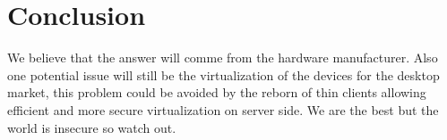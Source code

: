 \section{Conclusion}

We believe that the answer will comme from the hardware manufacturer.
Also one potential issue will still be the virtualization of the devices for
the desktop market, this problem could be avoided by the reborn of thin clients
allowing efficient and more secure virtualization on server side.
We are the best but the world is insecure so watch out.
